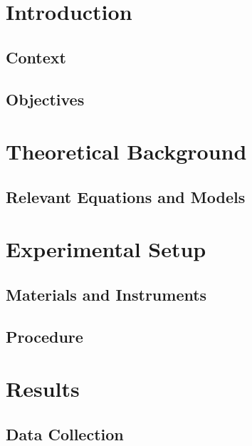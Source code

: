\section{Introduction}

\subsection{Context}

\subsection{Objectives}

\section{Theoretical Background}

\subsection{Relevant Equations and Models}

\section{Experimental Setup}

\subsection{Materials and Instruments}

\subsection{Procedure}

\section{Results}

\subsection{Data Collection}
